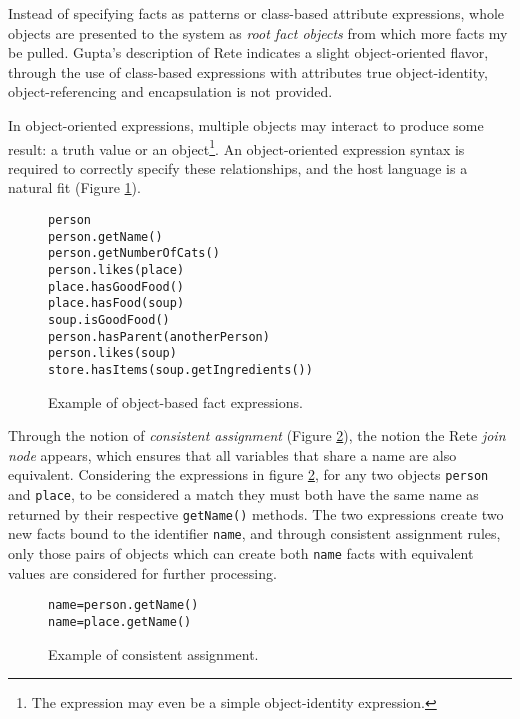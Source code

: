 \documentclass[10pt,twocolumn,letterpaper,colorhighlight]{article}
\newenvironment{codelisting}%
	{\begin{minipage}{250pt}\small\begin{alltt}}%
	{\end{alltt}\end{minipage}}
\begin{document}
Instead of specifying facts as patterns or class-based attribute
expressions, whole objects are presented to the system as \emph{root
fact objects} from which more facts my be pulled.  Gupta's description
of Rete \cite{gupta89highspeed} indicates a slight object-oriented
flavor, through the use of class-based expressions with attributes
true object-identity, object-referencing and encapsulation is not provided.

In object-oriented expressions, multiple objects may interact to produce
some result: a truth value or an object\footnote{The expression may
even be a simple object-identity expression.}.  An object-oriented 
expression syntax is required to correctly specify these
relationships, and the host language is a natural fit 
(Figure \ref{example.object-based.patterns}).

	\begin{figure}
	\begin{codelisting}
	person
	person.getName()
	person.getNumberOfCats()
	person.likes( place )
	place.hasGoodFood()
	place.hasFood( soup )
	soup.isGoodFood()
	person.hasParent( anotherPerson )
	person.likes( soup )
	store.hasItems( soup.getIngredients() )
	\end{codelisting}

	\caption{Example of object-based fact expressions.}
	\label{example.object-based.patterns}
	\end{figure}

Through the notion of \emph{consistent assignment} (Figure
\ref{example.expr.consistent-assignment}), the notion the Rete \emph{join
node} appears, which ensures that all variables that share a name are also equivalent.
Considering the expressions in figure \ref{example.expr.consistent-assignment}, for any two
objects \verb|person| and \verb|place|, to be considered a match they
must both have the same name as returned by their respective
\verb|getName()| methods. The two expressions create two new facts
bound to the identifier \verb|name|, and through consistent assignment
rules, only those pairs of objects which can create both \verb|name|
facts with equivalent values are considered for further processing.

	\begin{figure}
	\begin{codelisting}
	name = person.getName()
	name = place.getName()
	\end{codelisting}

	\caption{Example of consistent assignment.}
	\label{example.expr.consistent-assignment}
	\end{figure}
\end{document}
